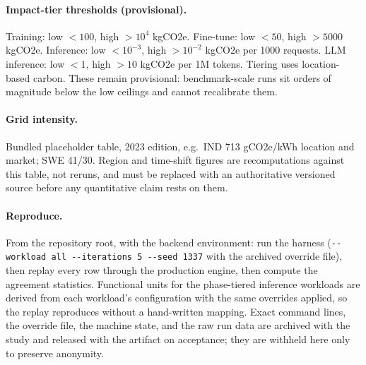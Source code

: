 \documentclass{article}
\begin{document}
\paragraph{Impact-tier thresholds (provisional).} Training: low $<100$, high
$>10^4$ kgCO2e. Fine-tune: low $<50$, high $>5000$ kgCO2e. Inference: low
$<10^{-3}$, high $>10^{-2}$ kgCO2e per 1000 requests. LLM inference: low $<1$,
high $>10$ kgCO2e per 1M tokens. Tiering uses location-based carbon. These
remain provisional: benchmark-scale runs sit orders of magnitude below the low
ceilings and cannot recalibrate them.

\paragraph{Grid intensity.} Bundled placeholder table, 2023 edition, e.g.\ IND
713 gCO2e/kWh location and market; SWE 41/30. Region and time-shift figures are
recomputations against this table, not reruns, and must be replaced with an
authoritative versioned source before any quantitative claim rests on them.

\paragraph{Reproduce.} From the repository root, with the backend environment:
run the harness (\verb|--workload all --iterations 5 --seed 1337| with the
archived override file), then replay every row through the production engine,
then compute the agreement statistics. Functional units for the phase-tiered
inference workloads are derived from each workload's configuration with the
same overrides applied, so the replay reproduces without a hand-written mapping.
Exact command lines, the override file, the machine state, and the raw run
data are archived with the study and released with the artifact on acceptance;
they are withheld here only to preserve anonymity.
\end{document}

